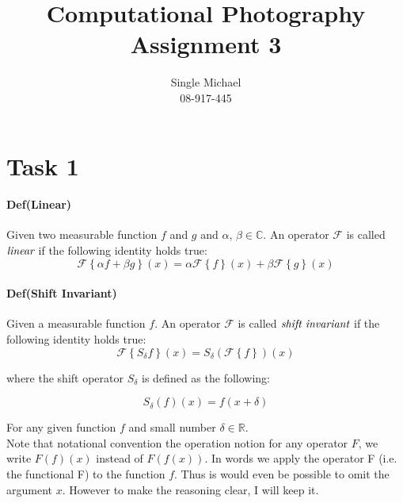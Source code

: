 \documentclass{paper}
\title{Computational Photography Assignment 3}
\author{Single Michael\\08-917-445}
\begin{document}
\maketitle


\section*{Task 1}

\paragraph{Def(Linear)} Given two measurable function $f$ and $g$ and $\alpha$, $\beta \in \mathbb{C}$. An operator $\mathcal{F}$ is called $\emph{linear}$ if the following identity holds true: \\
\begin{equation}
    \mathcal{F} \left \{\alpha f + \beta g \right\}(x) = \alpha \mathcal{F} \left \{f\right\}(x) + \beta \mathcal{F} \left \{g \right\}(x)
\label{eq:lin_op}
\end{equation}

\paragraph{Def(Shift Invariant)} Given a measurable function $f$. An operator $\mathcal{F}$ is called $\emph{shift invariant}$ if the following identity holds true: \\
\begin{equation}
    \mathcal{F} \left \{S_\delta f \right\} (x) = S_\delta(\mathcal{F}\left \{f \right\})(x)
\label{eq:shift_inv_op}
\end{equation}

where the shift operator $S_{\delta}$ is defined as the following: 

\begin{equation}
    S_{\delta}(f)(x) = f(x+\delta)
\label{eq:shift_op}
\end{equation}

For any given function $f$ and small number $\delta \in \mathbb{R}$. \\

Note that notational convention the operation notion for any operator $F$, we write $F(f)(x)$ instead of $F(f(x))$. In words we apply the operator F (i.e. the functional F) to the function $f$. Thus is would even be possible to omit the argument $x$. However to make the reasoning clear, I will keep it. \\
\end{document}
